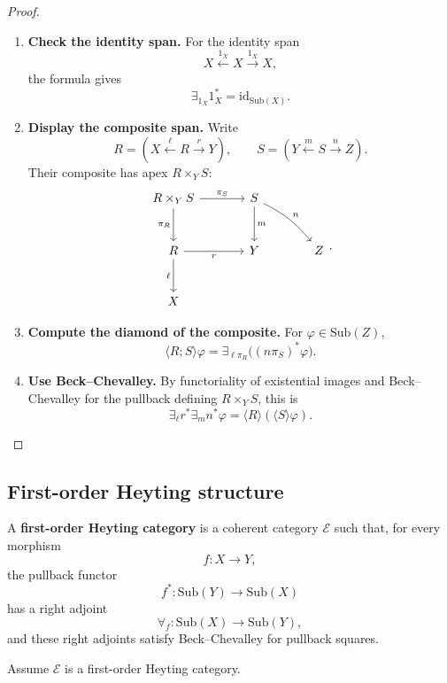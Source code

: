 \begin{proof}
\leavevmode
\begin{enumerate}
\item \textbf{Check the identity span.}
For the identity span
\[
X\xleftarrow{1_X}X\xrightarrow{1_X}X,
\]
the formula gives
\[
\exists_{1_X}1_X^\ast=\mathrm{id}_{\mathrm{Sub}(X)}.
\]

\item \textbf{Display the composite span.}
Write
\[
R=(X\xleftarrow{\ell}R\xrightarrow{r}Y),
\qquad
S=(Y\xleftarrow{m}S\xrightarrow{n}Z).
\]
Their composite has apex \(R\times_Y S\):
\[
\begin{tikzcd}[column sep=large,row sep=large]
R\times_Y S
  \arrow[r,"\pi_S"]
  \arrow[d,"\pi_R"']
&
S
  \arrow[d,"m"]
  \arrow[dr,"n",bend left=12]
&
\\
R
  \arrow[r,"r"']
  \arrow[d,"\ell"']
&
Y
&
Z
\\
X
&&
\end{tikzcd}
.
\]

\item \textbf{Compute the diamond of the composite.}
For \(\varphi\in\mathrm{Sub}(Z)\),
\[
\langle R;S\rangle\varphi
=
\exists_{\ell\pi_R}\bigl((n\pi_S)^\ast\varphi\bigr).
\]

\item \textbf{Use Beck--Chevalley.}
By functoriality of existential images and Beck--Chevalley for the pullback
defining \(R\times_Y S\), this is
\[
\exists_\ell r^\ast\exists_m n^\ast\varphi
=
\langle R\rangle(\langle S\rangle\varphi).
\]
\end{enumerate}
\end{proof}


\subsection{First-order Heyting structure}
\label{subsec:relative-first-order-heyting}

\begin{definition}
\label{def:relative-first-order-heyting}
A \textbf{first-order Heyting category} is a coherent category
\(\mathcal E\) such that, for every morphism
\[
f:X\to Y,
\]
the pullback functor
\[
f^\ast:\mathrm{Sub}(Y)\to\mathrm{Sub}(X)
\]
has a right adjoint
\[
\forall_f:\mathrm{Sub}(X)\to\mathrm{Sub}(Y),
\]
and these right adjoints satisfy Beck--Chevalley for pullback squares.
\end{definition}

Assume \(\mathcal E\) is a first-order Heyting category.

